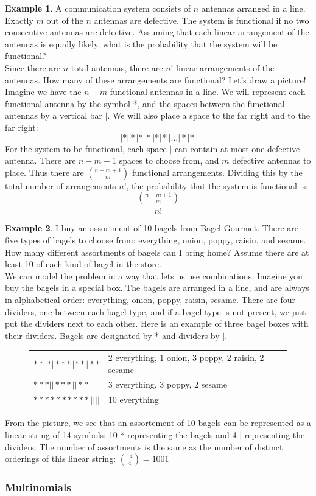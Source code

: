 \documentclass[12pt]{article}
\theoremstyle{definition}
\newtheorem*{example}{Example}
\theoremstyle{remark}
\begin{document}
\begin{example}A communication system consists of $n$ antennas arranged in a line. Exactly $m$ out of the $n$ antennas are defective. The system is functional if no two consecutive antennas are defective. Assuming that each linear arrangement of the antennas is equally likely, what is the probability that the system will be functional?\\

Since there are $n$ total antennas, there are $n!$ linear arrangements of the antennas. How many of these arrangements are functional? Let's draw a picture! Imagine we have the $n - m$ functional antennas in a line. We will represent each functional antenna by the symbol *, and the spaces between the functional antennas by a vertical bar $|$. We will also place a space to the far right and to the far right:
\[
| * | * | * | * | * | * | \dots | * | * |
\]
For the system to be functional, each space $|$ can contain at most one defective antenna. There are $n - m + 1$ spaces to choose from, and $m$ defective antennas to place. Thus there are $\binom{n-m+1}{m}$ functional arrangements. Dividing this by the total number of arrangements $n!$, the probability that the system is functional is:
\[
\frac{ \binom{n-m+1}{m}}{n!}
\]
\end{example}

\begin{example}
I buy an assortment of 10 bagels from Bagel Gourmet. There are five types of bagels to choose from: everything, onion, poppy, raisin, and sesame. How many different assortments of bagels can I bring home? Assume there are at least 10 of each kind of bagel in the store.\\

We can model the problem in a way that lets us use combinations. Imagine you buy the bagels in a special box. The bagels are arranged in a line, and are always in alphabetical order: everything, onion, poppy, raisin, sesame. There are four dividers, one between each bagel type, and if a bagel type is not present, we just put the dividers next to each other. Here is an example of three bagel boxes with their dividers. Bagels are designated by * and dividers by $|$.
\begin{figure}[H]
\begin{tabular}{ll}
$* * | * | * * * | * * | * *$ & 2 everything, 1 onion, 3 poppy, 2 raisin, 2 sesame \\
$* * * | | * * * | | * *$ & 3 everything, 3 poppy, 2 sesame\\
$* * * * * * * * * * | | | |$ & 10 everything\\
\end{tabular}
\end{figure}
From the picture, we see that an assortement of 10 bagels can be represented as a linear string of 14 symbols: 10 * representing the bagels and 4 $|$ representing the dividers. The number of assortments is the same as the number of distinct orderings of this linear string: $\binom{14}{4} = 1001$
\end{example}

\subsubsection{Multinomials}
\end{document}
